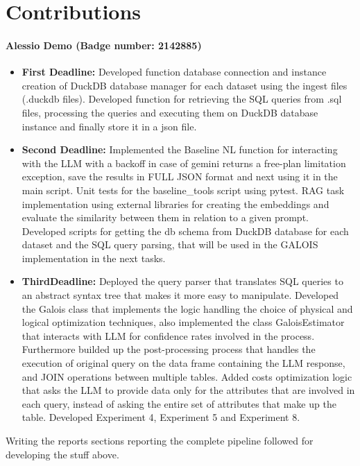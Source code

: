 \section{Contributions}
\label{sec:contributions}
\paragraph{\textbf{Alessio Demo (Badge number: 2142885)}}
\begin{itemize}[leftmargin=*]
    \item \textbf{First Deadline:}  Developed function database connection and instance creation of DuckDB database manager for each dataset using the ingest files (.duckdb files).
    Developed function for retrieving the SQL queries from .sql files, processing the queries and executing them on DuckDB database instance and finally store it in a json file. 
    \item \textbf{Second Deadline:} Implemented the Baseline NL function for interacting with the LLM with a backoff in case of gemini returns a free-plan limitation exception, save the results in FULL JSON format and next using it in the main script. Unit tests for the baseline\_tools script using pytest. RAG task implementation using external libraries for creating the embeddings and evaluate the similarity between them in relation to a given prompt.
    Developed scripts for getting the db schema from DuckDB database for each dataset and the SQL query parsing, that will be used in the GALOIS implementation in the next tasks.
    \item \textbf{ThirdDeadline:} Deployed the query parser that translates SQL queries to an abstract syntax tree that
    makes it more easy to manipulate. Developed the Galois class that implements the logic
    handling the choice of physical and logical optimization techniques, also implemented
    the class GaloisEstimator that interacts with LLM for confidence rates involved in the
    process. Furthermore builded up the post-processing process that handles the execution
    of original query on the data frame containing the LLM response, and JOIN operations
    between multiple tables. Added costs optimization logic that asks the LLM to provide
    data only for the attributes that are involved in each query, instead of asking the entire
    set of attributes that make up the table.
    Developed Experiment 4, Experiment 5 and Experiment 8.
\end{itemize}
Writing the reports sections reporting the complete pipeline followed for developing the stuff above.

